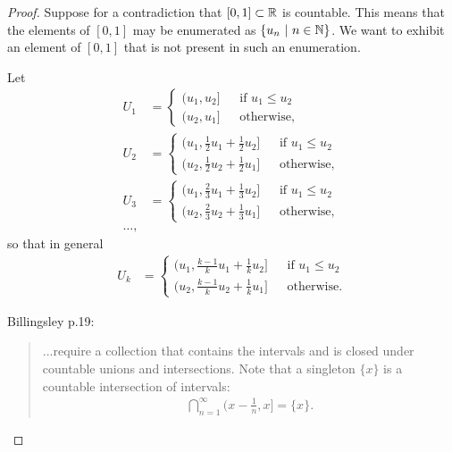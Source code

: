 \begin{proof}
  Suppose for a contradiction that $[0, 1] \subset \mathbb{R}$ is countable. This means that the elements of $[0, 1]$
  may be enumerated as $\{u_n ~|~ n \in \mathbb{N}\}$. We want to exhibit an element of $[0, 1]$ that is not present in
  such an enumeration.

 Let
  \begin{align*}
    U_1 &=
    \begin{cases}
      \big(u_1, u_2\big] ~~~~~~~\text{if } u_1 \leq u_2\\
      \big(u_2, u_1\big] ~~~~~~~\text{otherwise},
    \end{cases}\\
    U_2 &=
    \begin{cases}
      \big(u_1, \frac{1}{2}u_1 + \frac{1}{2}u_2\big] ~~~~~~~\text{if } u_1 \leq u_2\\
      \big(u_2, \frac{1}{2}u_2 + \frac{1}{2}u_1\big] ~~~~~~~\text{otherwise},
    \end{cases}\\
    U_3 &=
    \begin{cases}
      \big(u_1, \frac{2}{3}u_1 + \frac{1}{3}u_2\big] ~~~~~~~\text{if } u_1 \leq u_2\\
      \big(u_2, \frac{2}{3}u_2 + \frac{1}{3}u_1\big] ~~~~~~~\text{otherwise},
    \end{cases}\\
    \ldots,
  \end{align*}
  so that in general
  \begin{align*}
    U_k &=
    \begin{cases}
      \big(u_1, \frac{k-1}{k}u_1 + \frac{1}{k}u_2\big] ~~~~~~~\text{if } u_1 \leq u_2\\
      \big(u_2, \frac{k-1}{k}u_2 + \frac{1}{k}u_1\big] ~~~~~~~\text{otherwise}.
    \end{cases}
  \end{align*}




  Billingsley p.19:
  \begin{quote}
    ...require a collection that contains the intervals and is closed under countable unions and intersections.
    Note that a singleton $\{x\}$ is a countable intersection of intervals:
    \begin{align*}
      \bigcap_{n=1}^\infty \Big(x -\frac{1}{n}, x\Big] = \{x\}.
    \end{align*}
  \end{quote}



\end{proof}